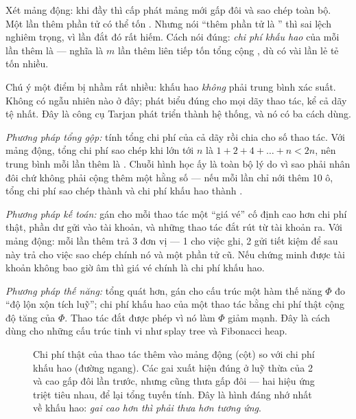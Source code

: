 \documentclass[../../algorithm.tex]{subfiles}
\begin{document}
Xét mảng động: khi đầy thì cấp phát mảng mới gấp đôi và sao chép toàn bộ. Một lần thêm phần tử có thể tốn . Nhưng nói ``thêm phần tử là '' thì sai lệch nghiêm trọng, vì lần đắt đó rất hiếm. Cách nói đúng: \emph{chi phí khấu hao} của mỗi lần thêm là  --- nghĩa là \(m\) lần thêm liên tiếp tốn tổng cộng , dù có vài lần lẻ tẻ tốn nhiều.

Chú ý một điểm bị nhầm rất nhiều: khấu hao \emph{không} phải trung bình xác suất. Không có ngẫu nhiên nào ở đây; phát biểu đúng cho mọi dãy thao tác, kể cả dãy tệ nhất. Đây là công cụ Tarjan phát triển thành hệ thống\cite{tarjan1985amortized}, và nó có ba cách dùng.

\emph{Phương pháp tổng gộp:} tính tổng chi phí của cả dãy rồi chia cho số thao tác. Với mảng động, tổng chi phí sao chép khi lớn tới \(n\) là \(1 + 2 + 4 + \dots + n < 2n\), nên trung bình mỗi lần thêm là . Chuỗi hình học ấy là toàn bộ lý do vì sao phải nhân đôi chứ không phải cộng thêm một hằng số --- nếu mỗi lần chỉ nới thêm 10 ô, tổng chi phí sao chép thành  và chi phí khấu hao thành .

\emph{Phương pháp kế toán:} gán cho mỗi thao tác một ``giá vé'' cố định cao hơn chi phí thật, phần dư gửi vào tài khoản, và những thao tác đắt rút từ tài khoản ra. Với mảng động: mỗi lần thêm trả 3 đơn vị --- 1 cho việc ghi, 2 gửi tiết kiệm để sau này trả cho việc sao chép chính nó và một phần tử cũ. Nếu chứng minh được tài khoản không bao giờ âm thì giá vé chính là chi phí khấu hao.

\emph{Phương pháp thế năng:} tổng quát hơn, gán cho cấu trúc một hàm thế năng \(\Phi\) đo ``độ lộn xộn tích luỹ''; chi phí khấu hao của một thao tác bằng chi phí thật cộng độ tăng của \(\Phi\). Thao tác đắt được phép vì nó làm \(\Phi\) giảm mạnh. Đây là cách dùng cho những cấu trúc tinh vi như splay tree\cite{sleator1985} và Fibonacci heap\cite{fredman1987}.

\begin{figure}[H]\centering
{}

\caption{Chi phí thật của thao tác thêm vào mảng động (cột) so với chi phí khấu hao (đường ngang). Các gai xuất hiện đúng ở luỹ thừa của 2 và cao gấp đôi lần trước, nhưng cũng thưa gấp đôi --- hai hiệu ứng triệt tiêu nhau, để lại tổng tuyến tính. Đây là hình đáng nhớ nhất về khấu hao: \emph{gai cao hơn thì phải thưa hơn tương ứng}.}
\label{fig:khauhao}
\end{figure}
\end{document}
